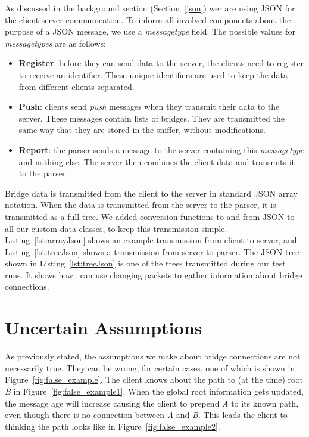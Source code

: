 As discussed in the background section (Section~\ref{json}) wer are using JSON for the client server communication.
To inform all involved components about the purpose of a JSON message, we use a \textit{messagetype} field.
The possible values for \textit{messagetypes} are as follows:
\begin{itemize}
    \item \textbf{Register}: before they can send data to the server, the clients need to register to receive an identifier.
        These unique identifiers are used to keep the data from different clients separated.
    \item \textbf{Push}: clients send \textit{push} messages when they transmit their data to the server.
        These messages contain lists of bridges.
        They are transmitted the same way that they are stored in the sniffer, without modifications.
    \item \textbf{Report}: the parser sends a message to the server containing this \textit{messagetype} and nothing else.
        The server then combines the client data and transmits it to the parser.
\end{itemize}
Bridge data is transmitted from the client to the server in standard JSON array notation.
When the data is transmitted from the server to the parser, it is transmitted as a full tree.
We added conversion functions to and from JSON to all our custom data classes, to keep this transmission simple.
Listing~\ref{lst:arrayJson} shows an example transmission from client to server, and Listing~\ref{lst:treeJson} shows a transmission from server to parser.
The JSON tree shown in Listing~\ref{lst:treeJson} is one of the trees transmitted during our test runs.
It shows how \tool\ can use changing packets to gather information about bridge connections.



\section{Uncertain Assumptions}
\label{uncertain_assumptions}
As previously stated, the assumptions we make about bridge connections are not necessarily true.
They can be wrong, for certain cases, one of which is shown in Figure~\ref{fig:false_example}.
The client knows about the path to (at the time) root \textit{B} in Figure~\ref{fig:false_example1}.
When the global root information gets updated, the message age will increase causing the client to prepend \textit{A} to its known path, even though there is no connection between \textit{A} and \textit{B}.
This leads the client to thinking the path looks like in Figure~\ref{fig:false_example2}.

